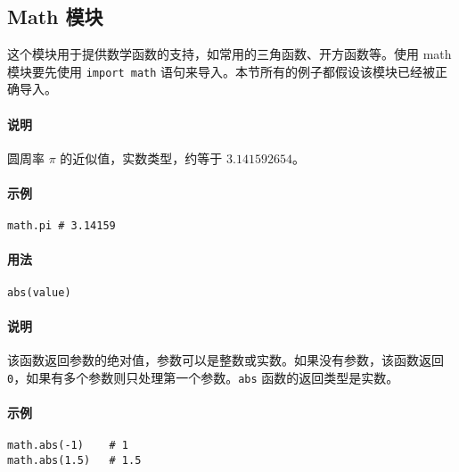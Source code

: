 \subsection{Math 模块}

这个模块用于提供数学函数的支持，如常用的三角函数、开方函数等。使用 math 模块要先使用 \texttt{import math} 语句来导入。本节所有的例子都假设该模块已经被正确导入。


\paragraph{说明}
圆周率 $\pi$ 的近似值，实数类型，约等于 $3.141592654$。

\paragraph{示例}
\begin{lstlisting}[language=berry, numbers=none]
math.pi # 3.14159
\end{lstlisting}


\paragraph{用法}
\begin{lstlisting}[language=berry, numbers=none]
abs(value)
\end{lstlisting}

\paragraph{说明}
该函数返回参数的绝对值，参数可以是整数或实数。如果没有参数，该函数返回 \texttt{0}，如果有多个参数则只处理第一个参数。\texttt{abs} 函数的返回类型是实数。

\paragraph{示例}
\begin{lstlisting}[language=berry, numbers=none]
math.abs(-1)    # 1
math.abs(1.5)   # 1.5
\end{lstlisting}

